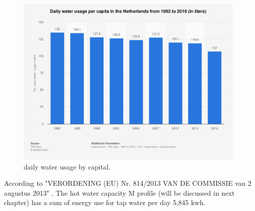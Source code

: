 \begin{figure}[H]
\centering
\includegraphics[width=1\columnwidth]{pictures/daily water usage.png}
\caption[Short title]{daily water usage by capital.}
\label{fig:waterusage}
\end{figure}



According to "VERORDENING (EU) Nr. 814/2013 VAN DE COMMISSIE van 2 augustus 2013" \cite{VERORDENING}. The hot water capacity M profile (will be discussed in next chapter) has a sum of energy use for tap water per day 5,845 kwh.


